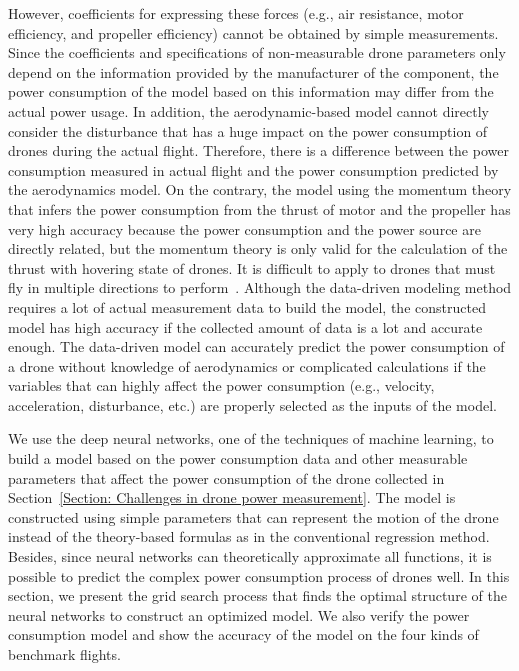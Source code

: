 \documentclass[journal]{./template/IEEEtran}
\begin{document}
However, coefficients for expressing these forces (e.g., air resistance, motor efficiency, and propeller efficiency) cannot be obtained by simple measurements. 
Since the coefficients and specifications of non-measurable drone parameters only depend on the information provided by the manufacturer of the component, the power consumption of the model based on this information may differ from the actual power usage.
In addition, the aerodynamic-based model cannot directly consider the disturbance that has a huge impact on the power consumption of drones during the actual flight.
Therefore, there is a difference between the power consumption measured in actual flight and the power consumption predicted by the aerodynamics model.
On the contrary, the model using the momentum theory that infers the power consumption from the thrust of motor and the propeller has very high accuracy because the power consumption and the power source are directly related, but the momentum theory is only valid for the calculation of the thrust with hovering state of drones. 
It is difficult to apply to drones that must fly in multiple directions to perform~\cite{ref_4}.
Although the data-driven modeling method requires a lot of actual measurement data to build the model, the constructed model has high accuracy if the collected amount of data is a lot and accurate enough.
The data-driven model can accurately predict the power consumption of a drone without knowledge of aerodynamics or complicated calculations if the variables that can highly affect the power consumption (e.g., velocity, acceleration, disturbance, etc.) are properly selected as the inputs of the model.

We use the deep neural networks, one of the techniques of machine learning, to build a model based on the power consumption data and other measurable parameters that affect the power consumption of the drone collected in Section~\ref{Section: Challenges in drone power measurement}.
The model is constructed using simple parameters that can represent the motion of the drone instead of the theory-based formulas as in the conventional regression method. 
Besides, since neural networks can theoretically approximate all functions, it is possible to predict the complex power consumption process of drones well.
In this section, we present the grid search process that finds the optimal structure of the neural networks to construct an optimized model. 
We also verify the power consumption model and show the accuracy of the model on the four kinds of benchmark flights.
\end{document}
